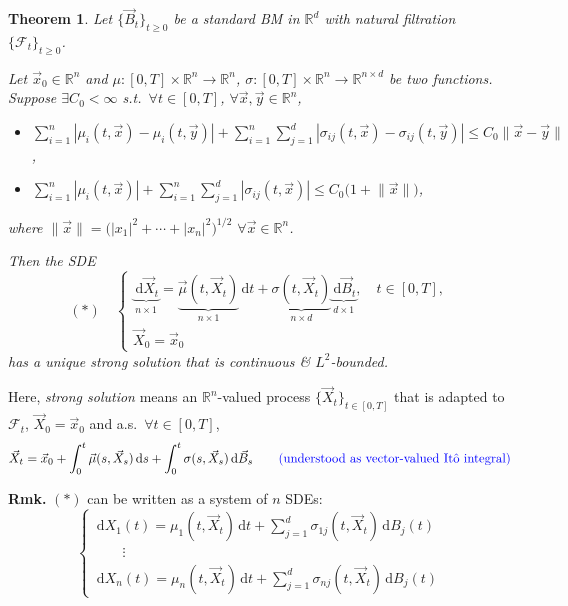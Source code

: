 \documentclass[11pt]{article}
\newcommand{\R}{\mathbb{R}}
\newcommand{\F}{\mathcal{F}}
\newcommand{\dd}{\,\mathrm{d}}
\newcommand{\nrm}[1]{\lVert #1\rVert}          %
\newcommand{\ann}[1]{\textcolor{blue}{#1}}
\theoremstyle{definition}
\theoremstyle{plain}
\newtheorem{theorem}{Theorem}[section]
\begin{document}
\begin{theorem}
Let $\{\vec B_t\}_{t\ge0}$ be a standard BM in $\R^d$ with natural filtration
$\{\F_t\}_{t\ge0}$.

\noindent Let $\vec x_0\in\R^n$ and $\mu:[0,T]\times\R^n\to\R^n$,
$\sigma:[0,T]\times\R^n\to\R^{n\times d}$ be two functions. Suppose
$\exists C_0<\infty$ s.t.\ $\forall t\in[0,T]$, $\forall\vec x,\vec y\in\R^n$,
\begin{itemize}
\item $\displaystyle\sum_{i=1}^n|\mu_i(t,\vec x)-\mu_i(t,\vec y)|
       +\sum_{i=1}^n\sum_{j=1}^d|\sigma_{ij}(t,\vec x)-\sigma_{ij}(t,\vec y)|
       \le C_0\nrm{\vec x-\vec y}$,
\item $\displaystyle\sum_{i=1}^n|\mu_i(t,\vec x)|
       +\sum_{i=1}^n\sum_{j=1}^d|\sigma_{ij}(t,\vec x)|
       \le C_0\bigl(1+\nrm{\vec x}\bigr)$,
\end{itemize}
where $\nrm{\vec x}=\bigl(|x_1|^2+\cdots+|x_n|^2\bigr)^{1/2}$ \quad $\forall\vec x\in\R^n$.

\noindent Then the SDE
\[
  (\ast)\quad
  \begin{cases}
    \underbrace{\dd\vec X_t}_{n\times1}
      =\underbrace{\vec\mu(t,\vec X_t)}_{n\times1}\dd t
      +\underbrace{\sigma(t,\vec X_t)}_{n\times d}\underbrace{\dd\vec B_t}_{d\times1},
      \quad t\in[0,T],\\[4pt]
    \vec X_0=\vec x_0
  \end{cases}
\]
has a unique strong solution that is continuous \& $L^2$-bounded.
\end{theorem}

\noindent Here, \emph{strong solution} means an $\R^n$-valued process
$\{\vec X_t\}_{t\in[0,T]}$ that is adapted to $\F_t$, $\vec X_0=\vec x_0$ and a.s.\
$\forall t\in[0,T]$,
\[
  \vec X_t=\vec x_0+\int_0^t\vec\mu(s,\vec X_s)\dd s+\int_0^t\sigma(s,\vec X_s)\dd\vec B_s
  \qquad\ann{\text{(understood as vector-valued It\^o integral)}}
\]

\medskip
\noindent\textbf{Rmk.} $(\ast)$ can be written as a system of $n$ SDEs:
\[
  \begin{cases}
    \dd X_1(t)=\mu_1(t,\vec X_t)\dd t+\sum\limits_{j=1}^d\sigma_{1j}(t,\vec X_t)\dd B_j(t)\\
    \qquad\vdots\\
    \dd X_n(t)=\mu_n(t,\vec X_t)\dd t+\sum\limits_{j=1}^d\sigma_{nj}(t,\vec X_t)\dd B_j(t)
  \end{cases}
\]
\end{document}
